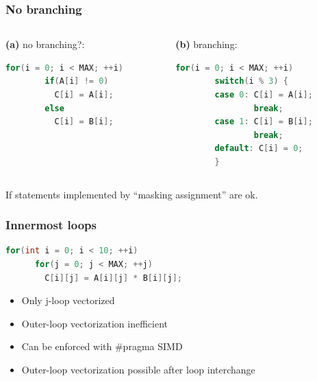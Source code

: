 \documentclass{beamer}
\begin{document}
\begin{frame}[fragile]
  \frametitle{No branching}
    \begin{columns}[onlytextwidth]
      \begin{column}{0.5\textwidth}
	 \textbf{(a)} no branching?:
	 \begin{lstlisting}[language=C++]
	  for(i = 0; i < MAX; ++i) 
	    if(A[i] != 0)
	      C[i] = A[i];
	    else
	      C[i] = B[i];
	\end{lstlisting}
      \end{column}
      \begin{column}{0.5\textwidth}
	\textbf{(b)} branching:
	\begin{lstlisting}[language=C++]
	  for(i = 0; i < MAX; ++i) 
	    switch(i % 3) {
	    case 0: C[i] = A[i]; 
	            break;
	    case 1: C[i] = B[i]; 
	            break;
	    default: C[i] = 0;
	    }
	\end{lstlisting}
      \end{column}
    \end{columns}
    
    If statements implemented by ``masking assignment'' are ok.
\end{frame}


\begin{frame}[fragile]
  \frametitle{Innermost loops}
    \begin{lstlisting}[language=C++]
	for(int i = 0; i < 10; ++i)
	  for(j = 0; j < MAX; ++j) 
	    C[i][j] = A[i][j] * B[i][j];   
    \end{lstlisting}
    \begin{itemize}
     \item Only j-loop vectorized
     \item Outer-loop vectorization inefficient
     \item Can be enforced with \#pragma SIMD
     \item Outer-loop vectorization possible after loop interchange
    \end{itemize}    
\end{frame}
\end{document}
